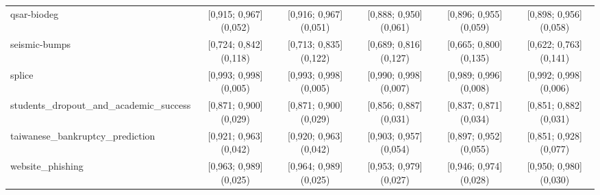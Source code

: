 \documentclass[11pt,a4paper]{article}
\begin{document}
\begin{table}[htbp]
{\begin{tabular}{@{}lccccc@{}}
        qsar-biodeg & [0,915; 0,967] (0,052) & [0,916; 0,967] (0,051) & [0,888; 0,950] (0,061) & [0,896; 0,955] (0,059) & [0,898; 0,956] (0,058) \\
        seismic-bumps & [0,724; 0,842] (0,118) & [0,713; 0,835] (0,122) & [0,689; 0,816] (0,127) & [0,665; 0,800] (0,135) & [0,622; 0,763] (0,141) \\
        splice & [0,993; 0,998] (0,005) & [0,993; 0,998] (0,005) & [0,990; 0,998] (0,007) & [0,989; 0,996] (0,008) & [0,992; 0,998] (0,006) \\
        students\_dropout\_and\_academic\_success & [0,871; 0,900] (0,029) & [0,871; 0,900] (0,029) & [0,856; 0,887] (0,031) & [0,837; 0,871] (0,034) & [0,851; 0,882] (0,031) \\
        taiwanese\_bankruptcy\_prediction & [0,921; 0,963] (0,042) & [0,920; 0,963] (0,042) & [0,903; 0,957] (0,054) & [0,897; 0,952] (0,055) & [0,851; 0,928] (0,077) \\
        website\_phishing & [0,963; 0,989] (0,025) & [0,964; 0,989] (0,025) & [0,953; 0,979] (0,027) & [0,946; 0,974] (0,028) & [0,950; 0,980] (0,030) \\
        \bottomrule
    \end{tabular}%
    }
\end{table}
\end{document}
